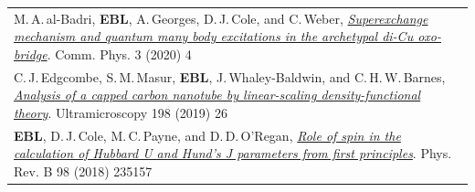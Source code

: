\documentclass[10pt,a4paper,final]{article}
\begin{document}
\begin{tabularx}{\textwidth}{
   X}
   \footnotesize M.\,A.\,al-Badri, \textbf{EBL}, A.\,Georges, D.\,J.\,Cole, and C.\,Weber, \href{https://www.nature.com/articles/s42005-019-0270-1}{\textit{Superexchange mechanism and quantum many body excitations in the archetypal di-Cu oxo-bridge}}. Comm. Phys. 3 (2020) 4                                                                                                                                                                                                                                                                                                                                                                                                                                                                                                   \\ %
   \footnotesize C.\,J.\,Edgcombe, S.\,M.\,Masur, \textbf{EBL}, J.\,Whaley-Baldwin, and C.\,H.\,W.\,Barnes, \href{https://www.sciencedirect.com/science/article/pii/S0304399118302833}{\textit{Analysis of a capped carbon nanotube by linear-scaling density-functional theory}}. Ultramicroscopy 198 (2019) 26                                                                                                                                                                                                                                                                                                                                                                                                                                                                     \\ %
   \footnotesize \textbf{EBL}, D.\,J.\,Cole, M.\,C.\,Payne, and D.\,D.\,O'Regan, \href{https://journals.aps.org/prb/abstract/10.1103/PhysRevB.98.235157}{\textit{Role of spin in the calculation of Hubbard U and Hund’s J parameters from first principles}}. Phys. Rev. B 98 (2018) 235157                                                                                                                                                                                                                                                                                                                                                                                                                                                                                         \\ %

\end{tabularx}
\end{document}
